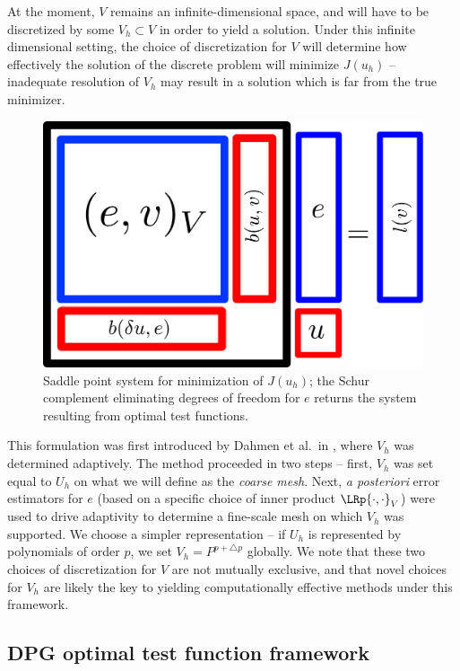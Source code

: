 At the moment, $V$ remains an infinite-dimensional space, and will have to be discretized by some $V_h\subset V$ in order to yield a solution.  Under this infinite dimensional setting, the choice of discretization for $V$ will determine how effectively the solution of the discrete problem will minimize $J(u_h)$ -- inadequate resolution of $V_h$ may result in a solution which is far from the true minimizer.  

\begin{figure}[!h]
\centering
\includegraphics[scale=.3]{figs/saddlePoint.pdf}
\caption{Saddle point system for minimization of $J(u_h)$; the Schur complement eliminating degrees of freedom for $e$ returns the system resulting from optimal test functions.}
\end{figure}

This formulation was first introduced by Dahmen et al.\ in \cite{DahmenVariationalStabilization}, where $V_h$ was determined adaptively.  The method proceeded in two steps -- first, $V_h$ was set equal to $U_h$ on what we will define as the \textit{coarse mesh}.  Next, \textit{a posteriori} error estimators for $e$ (based on a specific choice of inner product $\LRp{\cdot,\cdot}_V$) were used to drive adaptivity to determine a fine-scale mesh on which $V_h$ was supported.  We choose a simpler representation -- if $U_h$ is represented by polynomials of order $p$, we set $V_h = P^{p+\triangle p}$ globally.  We note that these two choices of discretization for $V$ are not mutually exclusive, and that novel choices for $V_h$ are likely the key to yielding computationally effective methods under this framework.  
\subsection{DPG optimal test function framework}

